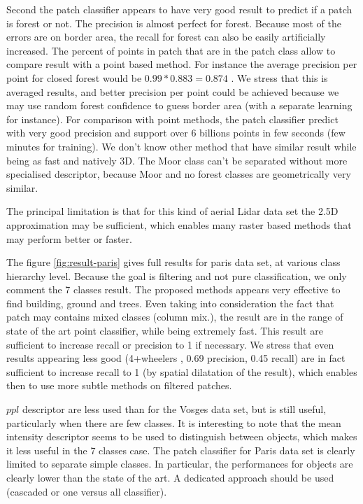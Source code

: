 		  Second the patch classifier appears to have very good result to predict if a patch is forest or not. The precision is almost perfect for forest.
		  Because most of the errors are on border area, the recall for forest can also be easily artificially increased. The percent of points in patch that are in the patch class allow to compare result with a point based method. 
		  For instance the average precision per point for closed forest would be $0.99*0.883=0.874$ . We stress that this is averaged results, and better precision per point could be achieved because we may use random forest confidence to guess border area (with a separate learning for instance).
		  For comparison with point methods, the patch classifier predict with very good precision and support over 6 billions points in few seconds (few minutes for training). We don't know other method that have similar result while being as fast and natively 3D.
		   The Moor class can't be separated without more specialised descriptor, because Moor and no forest classes are geometrically very similar.
		  
		  The principal limitation is that for this kind of aerial Lidar data set the 2.5D approximation may be sufficient, which enables many raster based methods that may perform better or faster.
		  
		  The figure \ref{fig:result-paris} gives full results for paris data set, at various class hierarchy level.
		  Because the goal is filtering and not pure classification, we only comment the 7 classes result. The proposed methods appears very effective to find building, ground and trees.
		  Even taking into consideration the fact that patch may contains mixed classes (column mix.), the result are in the range of state of the art point classifier, while being extremely fast. 
		  This result are sufficient to increase recall or precision to 1 if necessary.
		  We stress that even results appearing less good (4+wheelers , 0.69 precision, 0.45 recall) are in fact sufficient to increase recall to 1 (by spatial dilatation of the result), which enables then to use more subtle methods on filtered patches.
		  
		  $ppl$ descriptor are less used than for the Vosges data set, but is still useful, particularly when there are few classes.
		  It is interesting to note that the mean intensity descriptor seems to be used to distinguish between objects, which makes it less useful in the 7 classes case.
		  The patch classifier for Paris data set is clearly limited to separate simple classes. In particular, the performances for objects are clearly lower than the state of the art. A dedicated approach should be used (cascaded or one versus all classifier). 
		  
